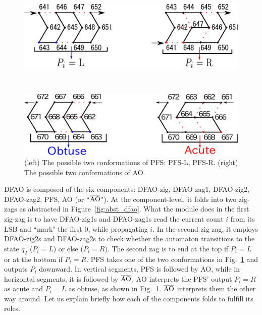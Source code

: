 \documentclass{article}
\theoremstyle{remark}
\begin{document}
\begin{figure}[h]
\centering
\begin{minipage}{0.4\hsize}
\includegraphics[width=\linewidth]{Pi.pdf}

\end{minipage}
\begin{minipage}{0.1\hsize}
\ \\
\end{minipage}
\begin{minipage}{0.4\hsize}
\includegraphics[width=\linewidth]{AO.pdf}

\end{minipage}  
\caption{(left) The possible two conformations of PFS: PFS-L, PFS-R. (right) The possible two conformations of AO.}
\label{fig:PFS}
\end{figure}



DFAO is composed of the six components: DFAO-zig, DFAO-zag1, DFAO-zig2, DFAO-zag2, PFS, AO (or  ``$\overline{\rm AO}$").
At the component-level, it folds into two zig-zags as abstracted in Figure~\ref{fig:abst_dfao}.
What the module does in the first zig-zag is to have DFAO-zig1s and DFAO-zag1s read the current count $i$ from its LSB and ``mark" the first 0, while propagating $i$.
In the second zig-zag, it employs DFAO-zig2s and DFAO-zag2s to check whether the automaton transitions to the state $q_2$ ($P_i = L$) or else ($P_i = R$).
The second zag is to end at the top if $P_i = L$ or at the bottom if $P_i = R$.
PFS takes one of the two conformations in Fig.~\ref{fig:PFS} and outputs $P_i$ downward.
In vertical segments, PFS is followed by AO, while in horizontal segments, it is followed by $\overline{\rm AO}$.
AO interprets the PFS' output $P_i = R$ as acute and $P_i = L$ as obtuse, as shown in Fig.~\ref{fig:PFS}.
$\overline{\rm AO}$ interprets them the other way around.
Let us explain briefly how each of the components folds to fulfill its roles.
\end{document}
